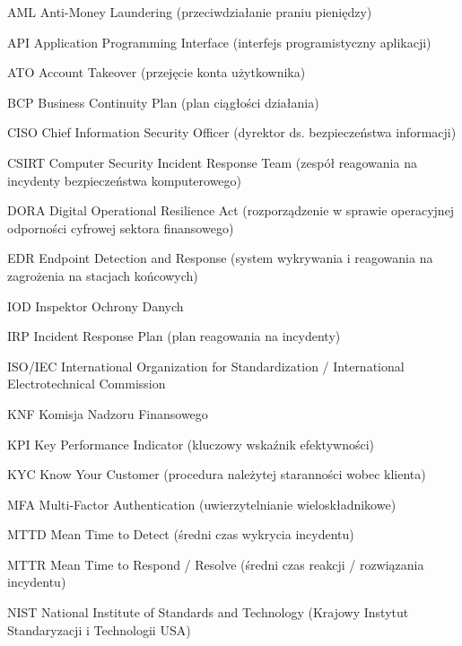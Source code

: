 \UnnumberedChapter{\abbrevname}

\begin{abbreviations}
    \item[AML]     Anti-Money Laundering (przeciwdziałanie praniu pieniędzy)
    \item[API]     Application Programming Interface (interfejs programistyczny aplikacji)
    \item[ATO]     Account Takeover (przejęcie konta użytkownika)
    \item[BCP]     Business Continuity Plan (plan ciągłości działania)
    \item[CISO]    Chief Information Security Officer (dyrektor ds. bezpieczeństwa informacji)
    \item[CSIRT]   Computer Security Incident Response Team (zespół reagowania na incydenty bezpieczeństwa komputerowego)
    \item[DORA]    Digital Operational Resilience Act (rozporządzenie w sprawie operacyjnej odporności cyfrowej sektora finansowego)
    \item[EDR]     Endpoint Detection and Response (system wykrywania i reagowania na zagrożenia na stacjach końcowych)
    \item[IOD]     Inspektor Ochrony Danych
    \item[IRP]     Incident Response Plan (plan reagowania na incydenty)
    \item[ISO/IEC] International Organization for Standardization / International Electrotechnical Commission
    \item[KNF]     Komisja Nadzoru Finansowego
    \item[KPI]     Key Performance Indicator (kluczowy wskaźnik efektywności)
    \item[KYC]     Know Your Customer (procedura należytej staranności wobec klienta)
    \item[MFA]     Multi-Factor Authentication (uwierzytelnianie wieloskładnikowe)
    \item[MTTD]    Mean Time to Detect (średni czas wykrycia incydentu)
    \item[MTTR]    Mean Time to Respond / Resolve (średni czas reakcji / rozwiązania incydentu)
    \item[NIST]    National Institute of Standards and Technology (Krajowy Instytut Standaryzacji i Technologii USA)

\end{abbreviations}
